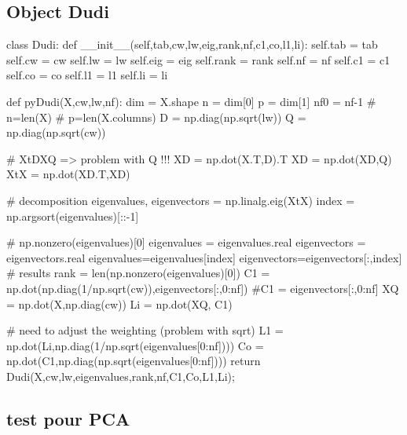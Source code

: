 \documentclass[
  10pt,
]{article}
\newenvironment{Shaded}{\begin{snugshade}}{\end{snugshade}}
\newcommand{\NormalTok}[1]{#1}
\begin{document}
\hypertarget{object-dudi}{%
\subsection{\texorpdfstring{Object
\textbf{Dudi}}{Object Dudi}}\label{object-dudi}}

\begin{Shaded}
\begin{Highlighting}[]
\NormalTok{class Dudi:}
\NormalTok{  def \_\_init\_\_(self,tab,cw,lw,eig,rank,nf,c1,co,l1,li):}
\NormalTok{    self.tab = tab}
\NormalTok{    self.cw = cw}
\NormalTok{    self.lw = lw}
\NormalTok{    self.eig = eig}
\NormalTok{    self.rank = rank}
\NormalTok{    self.nf = nf}
\NormalTok{    self.c1 = c1}
\NormalTok{    self.co = co}
\NormalTok{    self.l1 = l1}
\NormalTok{    self.li = li}

\NormalTok{def pyDudi(X,cw,lw,nf):}
\NormalTok{  dim = X.shape}
\NormalTok{  n = dim[0]}
\NormalTok{  p = dim[1]}
\NormalTok{  nf0 = nf{-}1}
\NormalTok{  \# n=len(X)}
\NormalTok{  \# p=len(X.columns)}
\NormalTok{  D = np.diag(np.sqrt(lw))}
\NormalTok{  Q = np.diag(np.sqrt(cw))}
  
\NormalTok{  \# XtDXQ =\textgreater{} problem  with Q !!!}
\NormalTok{  XD = np.dot(X.T,D).T}
\NormalTok{  XD = np.dot(XD,Q)}
\NormalTok{  XtX = np.dot(XD.T,XD)}
  
\NormalTok{  \# decomposition}
\NormalTok{  eigenvalues, eigenvectors = np.linalg.eig(XtX)}
\NormalTok{  index = np.argsort(eigenvalues)[::{-}1]}
  
\NormalTok{  \# np.nonzero(eigenvalues)[0]}
\NormalTok{  eigenvalues = eigenvalues.real}
\NormalTok{  eigenvectors = eigenvectors.real}
\NormalTok{  eigenvalues=eigenvalues[index]}
\NormalTok{  eigenvectors=eigenvectors[:,index]}
\NormalTok{  \# results}
\NormalTok{  rank = len(np.nonzero(eigenvalues)[0])}
\NormalTok{  C1 = np.dot(np.diag(1/np.sqrt(cw)),eigenvectors[:,0:nf])}
\NormalTok{  \#C1 = eigenvectors[:,0:nf]}
\NormalTok{  XQ = np.dot(X,np.diag(cw))}
\NormalTok{  Li = np.dot(XQ, C1)}
  
\NormalTok{  \# need to adjust the weighting (problem with sqrt)}
\NormalTok{  L1 = np.dot(Li,np.diag(1/np.sqrt(eigenvalues[0:nf])))}
\NormalTok{  Co = np.dot(C1,np.diag(np.sqrt(eigenvalues[0:nf])))}
\NormalTok{  return Dudi(X,cw,lw,eigenvalues,rank,nf,C1,Co,L1,Li);}
\end{Highlighting}
\end{Shaded}

\hypertarget{test-pour-pca}{%
\subsection{test pour PCA}\label{test-pour-pca}}
\end{document}
